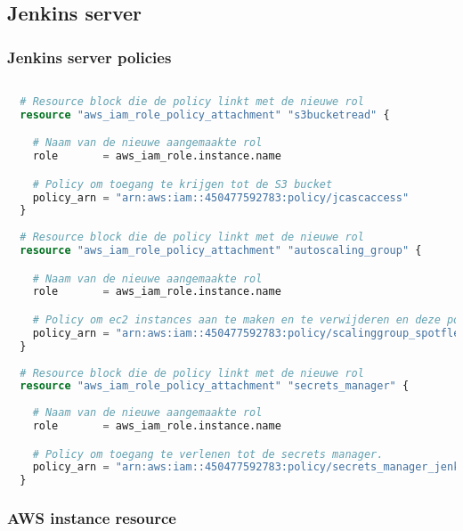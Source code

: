 \subsection{
{Jenkins server}}
\label{sec:Jenkins server}

\subsubsection{
{Jenkins server policies}}
\label{sec:Jenkins server policies}

\begin{lstlisting}[language=terraform] 
  
  # Resource block die de policy linkt met de nieuwe rol
  resource "aws_iam_role_policy_attachment" "s3bucketread" {

    # Naam van de nieuwe aangemaakte rol
    role       = aws_iam_role.instance.name

    # Policy om toegang te krijgen tot de S3 bucket
    policy_arn = "arn:aws:iam::450477592783:policy/jcascaccess"
  }
  
  # Resource block die de policy linkt met de nieuwe rol
  resource "aws_iam_role_policy_attachment" "autoscaling_group" {

    # Naam van de nieuwe aangemaakte rol
    role       = aws_iam_role.instance.name

    # Policy om ec2 instances aan te maken en te verwijderen en deze policy verleent toegang to verschillende autoscaling functies
    policy_arn = "arn:aws:iam::450477592783:policy/scalinggroup_spotfleet"
  }
  
  # Resource block die de policy linkt met de nieuwe rol
  resource "aws_iam_role_policy_attachment" "secrets_manager" {
    
    # Naam van de nieuwe aangemaakte rol
    role       = aws_iam_role.instance.name

    # Policy om toegang te verlenen tot de secrets manager.
    policy_arn = "arn:aws:iam::450477592783:policy/secrets_manager_jenkins"
  } 
\end{lstlisting}


\subsubsection{
{AWS instance resource}}


